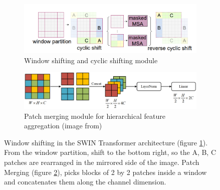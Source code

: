 \begin{figure}[!h]
	\centering
	\begin{subfigure}{\textwidth}
		\centering
		\includegraphics[width=0.8\linewidth]{figures/windowshifting}
		\caption{Window shifting and cyclic shifting module}
		\label{fig:windowshifting}
	\end{subfigure}
	\hfill
	\begin{subfigure}{\textwidth}
		\centering
		\includegraphics[width=0.9\linewidth]{figures/patch_merging}
		\caption{Patch merging module for hierarchical feature aggregation (image from\cite{swin_unet})}
		\label{fig:patchmerging}
	\end{subfigure}
	\caption{Window shifting in the SWIN Transformer architecture (figure \ref{fig:windowshifting}). From the window partition, shift to the bottom right, so the A, B, C patches are rearranged in the mirrored side of the image. Patch Merging (figure \ref{fig:patchmerging}), picks blocks of 2 by 2 patches inside a window and concatenates them along the channel dimension.}
	\label{fig:combined}
\end{figure}

